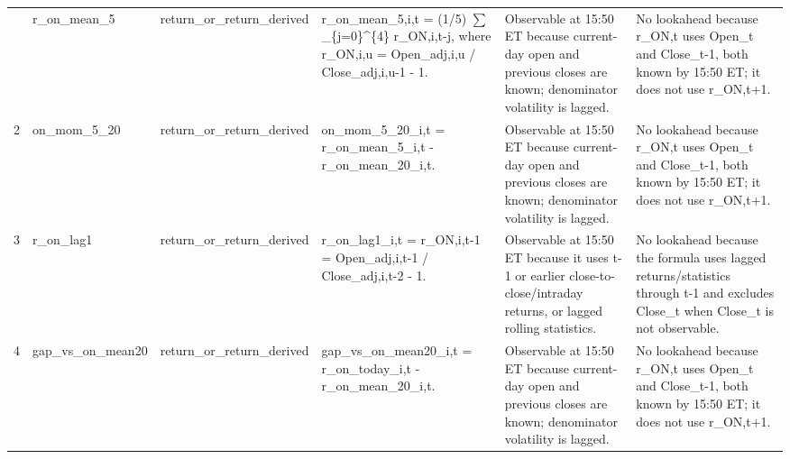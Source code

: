 \begin{landscape}
\begin{longtable}{P{0.42cm} P{2.25cm} P{2.05cm} P{5.25cm} P{4.85cm} P{5.25cm}}
\bottomrule
{} & r\_\allowbreak{}on\_\allowbreak{}mean\_\allowbreak{}5 & return\_\allowbreak{}or\_\allowbreak{}return\_\allowbreak{}derived & r\_\allowbreak{}on\_\allowbreak{}mean\_\allowbreak{}5,i,t = (1/5) $\sum$\_\allowbreak{}\{j=0\}\textasciicircum{}\{4\} r\_\allowbreak{}ON,i,t-j, where r\_\allowbreak{}ON,i,u = Open\_\allowbreak{}adj,i,u / Close\_\allowbreak{}adj,i,u-1 - 1. & Observable at 15:50 ET because current-day open and previous closes are known; denominator volatility is lagged. & No lookahead because r\_\allowbreak{}ON,t uses Open\_\allowbreak{}t and Close\_\allowbreak{}t-1, both known by 15:50 ET; it does not use r\_\allowbreak{}ON,t+1. \\
2 & on\_\allowbreak{}mom\_\allowbreak{}5\_\allowbreak{}20 & return\_\allowbreak{}or\_\allowbreak{}return\_\allowbreak{}derived & on\_\allowbreak{}mom\_\allowbreak{}5\_\allowbreak{}20\_\allowbreak{}i,t = r\_\allowbreak{}on\_\allowbreak{}mean\_\allowbreak{}5\_\allowbreak{}i,t - r\_\allowbreak{}on\_\allowbreak{}mean\_\allowbreak{}20\_\allowbreak{}i,t. & Observable at 15:50 ET because current-day open and previous closes are known; denominator volatility is lagged. & No lookahead because r\_\allowbreak{}ON,t uses Open\_\allowbreak{}t and Close\_\allowbreak{}t-1, both known by 15:50 ET; it does not use r\_\allowbreak{}ON,t+1. \\
3 & r\_\allowbreak{}on\_\allowbreak{}lag1 & return\_\allowbreak{}or\_\allowbreak{}return\_\allowbreak{}derived & r\_\allowbreak{}on\_\allowbreak{}lag1\_\allowbreak{}i,t = r\_\allowbreak{}ON,i,t-1 = Open\_\allowbreak{}adj,i,t-1 / Close\_\allowbreak{}adj,i,t-2 - 1. & Observable at 15:50 ET because it uses t-1 or earlier close-to-close/intraday returns, or lagged rolling statistics. & No lookahead because the formula uses lagged returns/statistics through t-1 and excludes Close\_\allowbreak{}t when Close\_\allowbreak{}t is not observable. \\
4 & gap\_\allowbreak{}vs\_\allowbreak{}on\_\allowbreak{}mean20 & return\_\allowbreak{}or\_\allowbreak{}return\_\allowbreak{}derived & gap\_\allowbreak{}vs\_\allowbreak{}on\_\allowbreak{}mean20\_\allowbreak{}i,t = r\_\allowbreak{}on\_\allowbreak{}today\_\allowbreak{}i,t - r\_\allowbreak{}on\_\allowbreak{}mean\_\allowbreak{}20\_\allowbreak{}i,t. & Observable at 15:50 ET because current-day open and previous closes are known; denominator volatility is lagged. & No lookahead because r\_\allowbreak{}ON,t uses Open\_\allowbreak{}t and Close\_\allowbreak{}t-1, both known by 15:50 ET; it does not use r\_\allowbreak{}ON,t+1. \\

\end{longtable}
\end{landscape}

